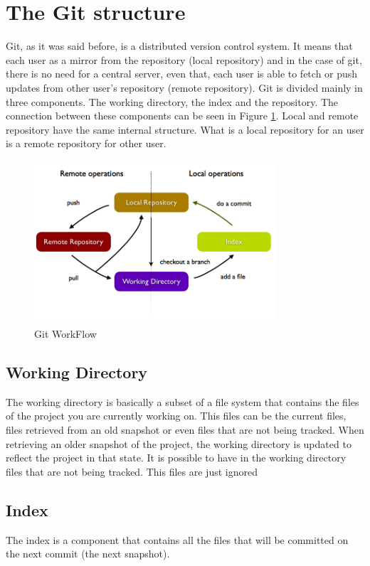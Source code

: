 \section{The Git structure}
Git, as it was said before, is a distributed version control system.
It means that each user as a mirror from the repository (local
repository) and in the case of
git, there is no need for a central server, even that, each user is able to
fetch or push updates from other user's repository (remote repository).
Git is divided mainly in three components. The working directory,
the index and the repository. The connection between these components
can be seen in Figure \ref{fig:git_structure}. Local and remote
repository have the same internal structure. What is a local
repository for an user is a remote repository for other user.

\begin{figure}[h!]
   \centering
   \includegraphics[width=0.8\textwidth]{images/data_flow_simplified.png}
   \caption{Git WorkFlow}\label{fig:git_structure}
\end{figure}

\subsection{Working Directory}

The working directory is basically a subset of
a file system that contains the files of the project you are
currently working on. This files can be the current files, files
retrieved from an old snapshot or even files that are not being
tracked. When retrieving an older snapshot of the project, the
working directory is updated to reflect the project in that state. It
is possible to have in the working directory files that are not being
tracked. This files are just ignored

\subsection{Index}
The index is a component that contains all the files that will be committed
on the next commit (the next snapshot).

